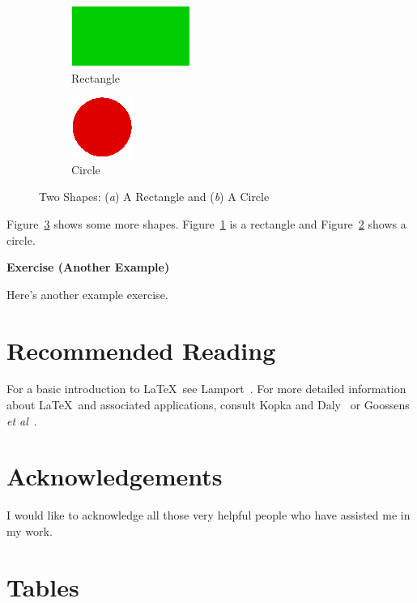 \documentclass[12pt,captions=tableabove]{scrbook}
\newenvironment{exercise}[1]%
{%
  \par\vspace{\baselineskip}\noindent
  \textbf{Exercise (#1)}\begin{itshape}%
  \par\vspace{\baselineskip}\noindent\ignorespaces
}%
{%
  \end{itshape}\ignorespacesafterend
}
\begin{document}
\begin{figure}[hbtp]
 \begin{subfigure}[b]{0.5\linewidth}
   \centering
   \includegraphics{rectangle}
   \caption{Rectangle}\label{fig:rectangle}
 \end{subfigure}%
 \begin{subfigure}[b]{0.5\linewidth}
   \centering
   \includegraphics{circle}
   \caption{Circle}\label{fig:circle}
 \end{subfigure}%
\caption{Two Shapes: (\emph{a}) A Rectangle and
(\emph{b}) A Circle}
\label{fig:shapes2}
\end{figure}

Figure~\ref{fig:shapes2} shows some more shapes.
Figure~\ref{fig:rectangle} is a rectangle and
Figure~\ref{fig:circle} shows a circle.

\begin{exercise}{Another Example}
Here's another example exercise.
\end{exercise}

\chapter{Recommended Reading}

For a basic introduction to \LaTeX\ see Lamport~\cite{lamport94}.
For more detailed information about \LaTeX\ and
associated applications, consult Kopka and Daly~\cite{kopka95}
or Goossens \emph{et al}~\cite{goossens94}.

\chapter*{Acknowledgements}

I would like to acknowledge all those
very helpful people who have assisted
me in my work.

\appendix
\chapter{Tables}
\end{document}

